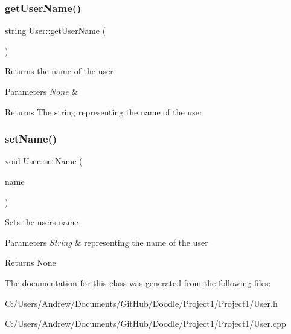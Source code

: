 \subsubsection{\texorpdfstring{get\+User\+Name()}{getUserName()}}
{\footnotesize\ttfamily string User\+::get\+User\+Name (\begin{DoxyParamCaption}{ }\end{DoxyParamCaption})}

Returns the name of the user 
\begin{DoxyParams}{Parameters}
{\em None} & \\
\hline
\end{DoxyParams}
\begin{DoxyReturn}{Returns}
The string representing the name of the user 
\end{DoxyReturn}
\mbox{\label{class_user_a93c208c3a71df99ca19a1782f6d32c34}} 
\subsubsection{\texorpdfstring{set\+Name()}{setName()}}
{\footnotesize\ttfamily void User\+::set\+Name (\begin{DoxyParamCaption}\item[{std\+::string}]{name }\end{DoxyParamCaption})}

Sets the user\textquotesingle{}s name 
\begin{DoxyParams}{Parameters}
{\em String} & representing the name of the user \\
\hline
\end{DoxyParams}
\begin{DoxyReturn}{Returns}
None 
\end{DoxyReturn}


The documentation for this class was generated from the following files\+:\begin{DoxyCompactItemize}
\item 
C\+:/\+Users/\+Andrew/\+Documents/\+Git\+Hub/\+Doodle/\+Project1/\+Project1/User.\+h\item 
C\+:/\+Users/\+Andrew/\+Documents/\+Git\+Hub/\+Doodle/\+Project1/\+Project1/User.\+cpp\end{DoxyCompactItemize}
